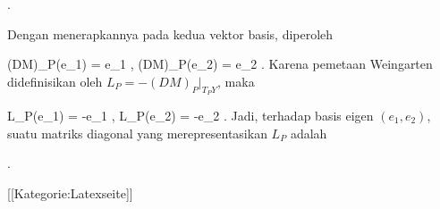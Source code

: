 { . }

Dengan menerapkannya pada kedua vektor basis, diperoleh

\mavergleichskettedisp
{\vergleichskette
{ (DM)_P(e_1)
}
{ =} { e_1
}
{ ,\quad }{ (DM)_P(e_2)
}
{ =} { e_2
}
{ } {
}
}
{}{}{.}
Karena pemetaan Weingarten didefinisikan oleh $L_P=-(DM)_P|_{T_PY}$, maka

\mavergleichskettedisp
{\vergleichskette
{ L_P(e_1)
}
{ =} { -e_1
}
{ ,\quad }{ L_P(e_2)
}
{ =} { -e_2
}
{ } {
}
}
{}{}{.}
Jadi, terhadap basis eigen $(e_1,e_2)$, suatu matriks diagonal yang merepresentasikan $L_P$ adalah

 { . }

 [[Kategorie:Latexseite]]
